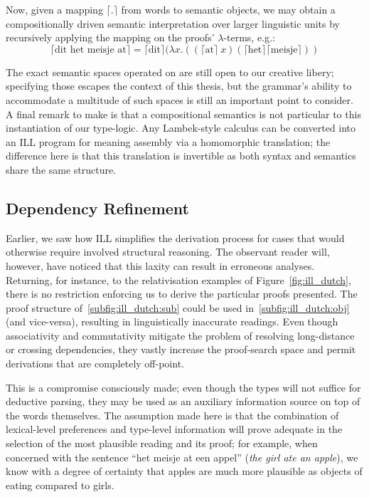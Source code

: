Now, given a mapping $\lceil .\rceil$ from words to semantic objects, we may obtain a compositionally driven semantic interpretation over larger linguistic units by recursively applying the mapping on the proofs' $\lambda$-terms, e.g.:
\[
\lceil \text{dit het meisje at} \rceil = \lceil \text{dit} \rceil (\lambda x. ((\lceil \text{at} \rceil \ x)(\lceil \text{het} \rceil \lceil \text{meisje} \rceil))
\]

The exact semantic spaces operated on are still open to our creative libery; specifying those escapes the context of this thesis, but the grammar's ability to accommodate a multitude of such spaces is still an important point to consider.
A final remark to make is that a compositional semantics is not particular to this instantiation of our type-logic. 
Any Lambek-style calculus can be converted into an ILL program for meaning assembly via a homomorphic translation; the difference here is that this translation is invertible as both syntax and semantics share the same structure.

\subsection{Dependency Refinement}
Earlier, we saw how ILL simplifies the derivation process for cases that would otherwise require involved structural reasoning.
The observant reader will, however, have noticed that this laxity can result in erroneous analyses.
Returning, for instance, to the relativisation examples of Figure~\ref{fig:ill_dutch}, there is no restriction enforcing us to derive the particular proofs presented.
The proof structure of~\ref{subfig:ill_dutch:sub} could be used in~\ref{subfig:ill_dutch:obj} (and vice-versa), resulting in linguistically inaccurate readings.
Even though associativity and commutativity mitigate the problem of resolving long-distance or crossing dependencies, they vastly increase the proof-search space and permit derivations that are completely off-point.

This is a compromise consciously made; even though the types will not suffice for deductive parsing, they may be used as an auxiliary information source on top of the words themselves.
The assumption made here is that the combination of lexical-level preferences and type-level information will prove adequate in the selection of the most plausible reading and its proof; for example, when concerned with the sentence ``het meisje at een appel'' (\textit{the girl ate an apple}), we know with a degree of certainty that apples are much more plausible as objects of eating compared to girls.

